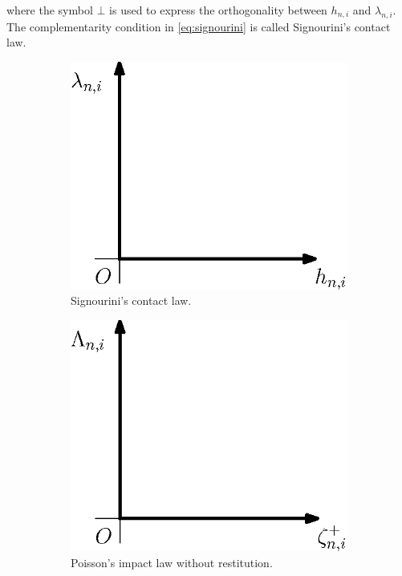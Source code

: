 \documentclass[../DC2017114Bouma.tex]{subfiles}
\begin{document}
where the symbol $\bot$ is used to express the orthogonality between $h_{n,i}$ and $\lambda_{n,i}$. The complementarity condition in \eqref{eq:signourini} is called Signourini's contact law.
\begin{figure}[h]
\centering
\begin{subfigure}{0.3\textwidth}
\centering
\includegraphics[width=\linewidth]{signourinicontact.eps}
\caption{Signourini's contact law.}\label{fig:signourinicontact}
\end{subfigure}
\qquad
\begin{subfigure}{0.3\textwidth}
\centering
\includegraphics[width=\linewidth]{poissonimpact.eps}
\caption{Poisson's impact law without restitution.}\label{fig:poissonimpact}
\end{subfigure}
\caption{}
\end{figure}
\end{document}
